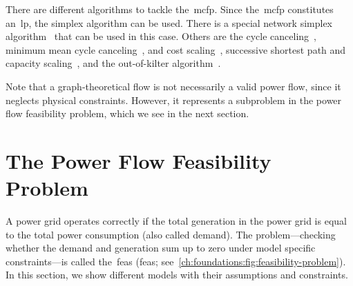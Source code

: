There are different algorithms to tackle the~\gls{mcfp}. Since the~\gls{mcfp}
constitutes an~\gls{lp}, the simplex algorithm can be used. There is a special
network simplex algorithm~\parencite{Orl93,Orl97,Tar97} that can be used in this
case. Others are the cycle canceling~\parencite{Kle67}\parencite[p.6, p.10,
p.50]{Gol89b}, minimum mean cycle canceling~\parencite[p.875]{Gol89}, and cost
scaling~\parencite{Gol90}\parencite[Chapter 3]{Gol89b}, successive shortest path
and capacity scaling~\parencite{Edm72}\parencite[Chapter 5]{Gol89b}, and the
out-of-kilter algorithm~\parencite{Ful61,Dur67,Swa73}.

Note that a graph-theoretical flow is not necessarily a valid power flow, since
it neglects physical constraints. However, it represents a subproblem in the
power flow feasibility problem, which we see in the next section.
% 
\section{The Power Flow Feasibility Problem}
\label{ch:foundations:sec:power-flow-analyses}
% 
A power grid operates correctly if the total generation in the power grid is
equal to the total power consumption (also called demand). The
problem---checking whether the demand and generation sum up to zero under model
specific constraints---is called the~\acrlong{feas} (\gls{feas};
see~\cref{ch:foundations:fig:feasibility-problem}). In this section, we show
different models with their assumptions and constraints. 

